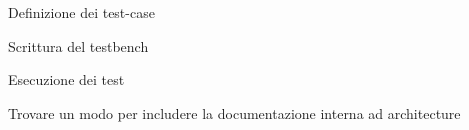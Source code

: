 
\begin{DoxyRefList}
\item[\label{todo__todo000001}%
\hypertarget{todo__todo000001}{}%
Class \hyperlink{classtruncate_1_1dataflow}{dataflow} ]
\begin{DoxyItemize}
\item Definizione dei test-\/case
\item Scrittura del testbench
\item Esecuzione dei test
\item Trovare un modo per includere la documentazione interna ad architecture 
\end{DoxyItemize}
\end{DoxyRefList}